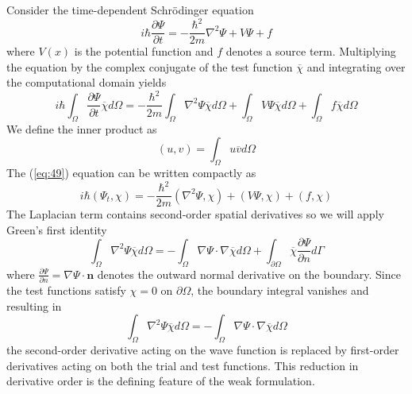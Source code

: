 \documentclass[11pt]{article}
\begin{document}
Consider the time-dependent Schrödinger equation
\begin{equation}
	i \hbar \frac{\partial\Psi}{\partial t} = - \frac{\hbar^2}{2m} \nabla^2 \Psi + V \Psi + f
\end{equation}
where $V(x)$ is the potential function and $f$ denotes a source term. Multiplying the equation by the complex conjugate of the test function $\overline{\chi}$ and integrating over the computational domain yields
\begin{equation} \label{eq:49}
	i \hbar \int_{\Omega} \frac{\partial \Psi}{\partial t} \overline{\chi} d \Omega = 
	- \frac{\hbar^2}{2m} \int_{\Omega} \nabla^2 \Psi \overline{\chi} d \Omega +
	 \int_{\Omega} V\Psi \overline{\chi} d \Omega +
	\int_{\Omega} f \overline{\chi} d \Omega
\end{equation}
We define the inner product as
\begin{equation}
	(u,v) = \int_{\Omega} u \overline{v} d \Omega
\end{equation}
The (\ref{eq:49}) equation can be written compactly as
\begin{equation}
	i \hbar (\Psi_t, \chi) = - \frac{\hbar^2}{2m} (\nabla^2 \Psi, \chi) + (V \Psi, \chi) + (f, \chi)	
\end{equation}
The Laplacian term contains second-order spatial derivatives so we will apply Green’s first identity 
\begin{equation}
	\int_{\Omega} \nabla^2 \Psi  \overline{\chi} d \Omega = - \int_{\Omega} \nabla \Psi \cdot \nabla \overline{\chi} d \Omega + \int_{\partial \Omega} \overline{\chi} \frac{\partial \Psi}{\partial n} d \Gamma
\end{equation}
where $\frac{\partial \Psi}{\partial n} = \nabla \Psi \cdot \mathbf{n}$ denotes the outward normal derivative on the boundary. Since the test functions satisfy $ \chi=0$ on $\partial \Omega$, the boundary integral vanishes and resulting in
\begin{equation}
	\int_{\Omega} \nabla^2 \Psi \overline{\chi} d \Omega = - \int_{\Omega} \nabla \Psi \cdot \nabla \overline{\chi} d \Omega
\end{equation}
the second-order derivative acting on the wave function is replaced by first-order derivatives acting on both the trial and test functions. This reduction in derivative order is the defining feature of the weak formulation.
\end{document}
